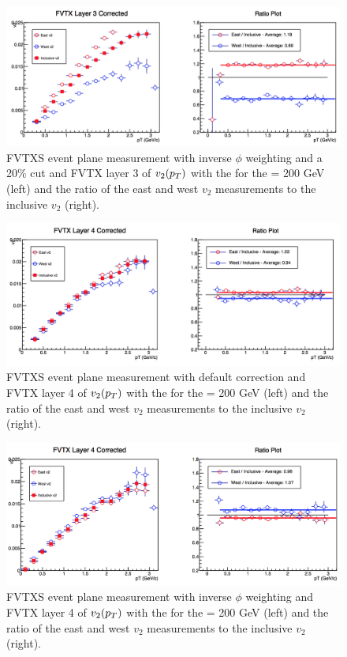 \begin{figure}[!ht]
\centering
\includegraphics[width=0.65\linewidth]{figs/fvtx_3_data_cut.png}
\caption{FVTXS event plane measurement with inverse $\phi$ weighting and a 20\% cut and FVTX layer 3 of $v_{2}(\mbox{$p_T$})$ with the  for the \pau \sqsn = 200 GeV (left) and the ratio of the east and west $v_2$ measurements to the inclusive $v_2$ (right).}
\end{figure}

\begin{figure}[!ht]
\centering
\includegraphics[width=0.65\linewidth]{figs/fvtx_4_default.png}
\caption{FVTXS event plane measurement with default correction and FVTX layer 4 of $v_{2}(\mbox{$p_T$})$ with the  for the \pau \sqsn = 200 GeV (left) and the ratio of the east and west $v_2$ measurements to the inclusive $v_2$ (right).}
\end{figure}

\begin{figure}[!ht]
\centering
\includegraphics[width=0.65\linewidth]{figs/fvtx_4_data.png}
\caption{FVTXS event plane measurement with inverse $\phi$ weighting and FVTX layer 4 of $v_{2}(\mbox{$p_T$})$ with the  for the \pau \sqsn = 200 GeV (left) and the ratio of the east and west $v_2$ measurements to the inclusive $v_2$ (right).}
\end{figure}

